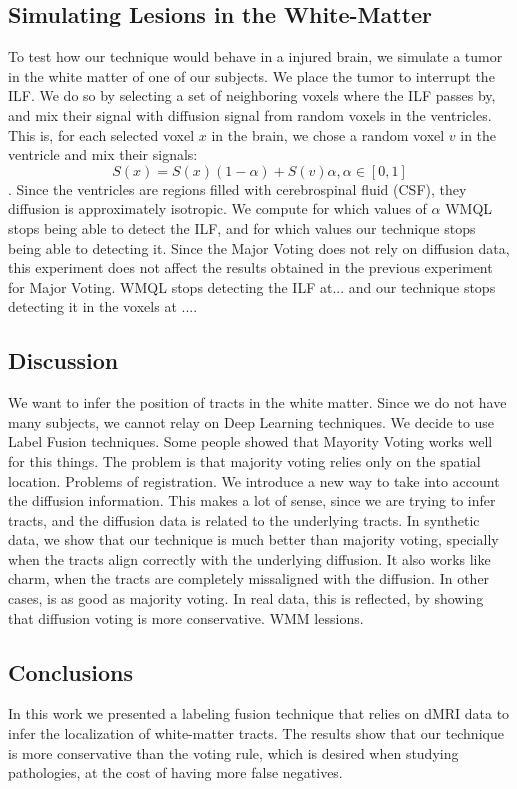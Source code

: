 \subsection{Simulating Lesions in the White-Matter}
To test how our technique would behave in a injured brain, we simulate a tumor in the white matter of one of our subjects. We place the tumor to interrupt the ILF. We do so by selecting a set of neighboring voxels where the ILF passes by, and mix their signal with diffusion signal from random voxels in the ventricles. This is, for each selected voxel $x$ in the brain, we chose a random voxel $v$ in the ventricle and mix their signals:
$$S(x) = S(x)(1-\alpha) + S(v)\alpha, \alpha \in [0,1]$$.
Since the ventricles are regions filled with cerebrospinal fluid (CSF), they diffusion is approximately isotropic. We compute for which values of $\alpha$ WMQL stops being able to detect the ILF, and for which values our technique stops being able to detecting it. Since the Major Voting does not rely on diffusion data, this experiment does not affect the results obtained in the previous experiment for Major Voting.
WMQL stops detecting the ILF at... and our technique stops detecting it in the voxels at .... 

\subsection{Discussion}
We want to infer the position of tracts in the white matter.
Since we do not have many subjects, we cannot relay on Deep Learning techniques.
We decide to use Label Fusion techniques.
Some people showed that Mayority Voting works well for this things.
The problem is that majority voting relies only on the spatial location.
Problems of registration.
We introduce a new way to take into account the diffusion information.
This makes a lot of sense, since we are trying to infer tracts, and the 
diffusion data is related to the underlying tracts.
In synthetic data, we show that our technique is much better than
majority voting, specially when the tracts align correctly with the
underlying diffusion. It also works like charm, when the tracts are completely
missaligned with the diffusion. In other cases, is as good as majority voting.
In real data, this is reflected, by showing that diffusion voting is more
conservative. WMM lessions.

\subsection{Conclusions}
In this work we presented a labeling fusion technique that relies on dMRI data
to infer the localization of white-matter tracts. The results show that our
technique is more conservative than the voting rule, which is desired when
studying pathologies, at the cost of having more false negatives.

